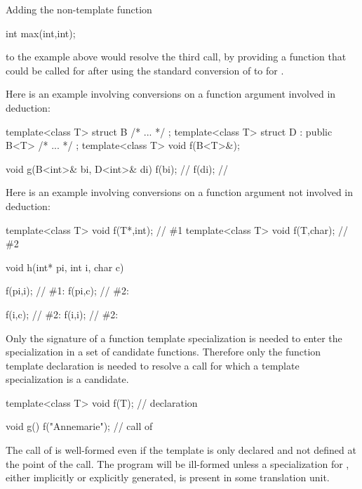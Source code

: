 \pnum
Adding the non-template function

\begin{codeblock}
int max(int,int);
\end{codeblock}

to the example above would resolve the third call, by providing a function that
could be called for
after using the standard conversion of
to
for
.

\pnum
Here is an example involving conversions on a function argument involved in
deduction:

\begin{codeblock}
template<class T> struct B { /* ... */ };
template<class T> struct D : public B<T> { /* ... */ };
template<class T> void f(B<T>&);

void g(B<int>& bi, D<int>& di) {
  f(bi);            // 
  f(di);            // 
}
\end{codeblock}

\pnum
Here is an example involving conversions on a function argument not involved in
deduction:

\begin{codeblock}
template<class T> void f(T*,int);       // \#1
template<class T> void f(T,char);       // \#2

void h(int* pi, int i, char c) {
  f(pi,i);          // \#1: 
  f(pi,c);          // \#2: 

  f(i,c);           // \#2: 
  f(i,i);           // \#2: 
}
\end{codeblock}
\exitexample

\pnum
Only the signature of a function template specialization is needed to enter the
specialization in a set of candidate functions.
Therefore only the function template declaration is needed to resolve a call
for which a template specialization is a candidate.
\enterexample

\begin{codeblock}
template<class T> void f(T);    // declaration

void g() {
  f("Annemarie");               // call of 
}
\end{codeblock}

\pnum
The call of
is well-formed even if the template
is only declared and not defined at the point of the call.
The program will be ill-formed unless a specialization for
,
either implicitly or explicitly generated,
is present in some translation unit.
\exitexample%

